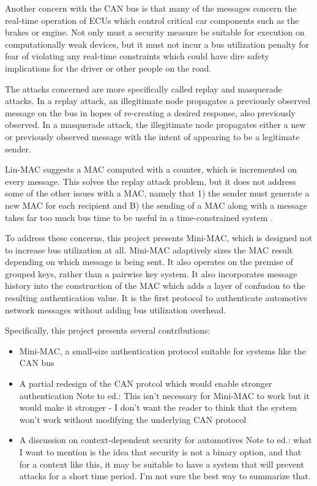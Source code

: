 Another concern with the CAN bus is that many of the messages concern the real-time operation of ECUs which control critical car components such as the brakes or engine. Not only must a security measure be suitable for execution on computationally weak devices, but it must not incur a bus utilization penalty for fear of violating any real-time constraints which could have dire safety implications for the driver or other people on the road.

The attacks concerned are more specifically called replay and masquerade attacks. In a replay attack, an illegitimate node propagates a previously observed message on the bus in hopes of re-creating a desired response, also previously observed. In a masquerade attack, the illegitimate node propagates either a new or previously observed message with the intent of appearing to be a legitimate sender.




Lin-MAC suggests a MAC computed with a counter, which is incremented on every message. This solves the replay attack problem, but it does not address some of the other issues with a MAC, namely that 1) the sender must generate a new MAC for each recipient and B) the sending of a MAC along with a message takes far too much bus time to be useful in a time-constrained system \cite{Lin-MAC}.

To address these concerns, this project presents Mini-MAC, which is designed not to increase bus utilization at all. Mini-MAC adaptively sizes the MAC result depending on which message is being sent. It also operates on the premise of grouped keys, rather than a pairwise key system. It also incorporates message history into the construction of the MAC which adds a layer of confusion to the resulting authentication value. It is the first protocol to authenticate automotive network messages without adding bus utilization overhead.

Specifically, this project presents several contributions:
\begin{itemize}
\item Mini-MAC, a small-size authentication protocol suitable for systems like the CAN bus
\item A partial redesign of the CAN protcol which would enable stronger authentication Note to ed.: This isn't necessary for Mini-MAC to work but it would make it stronger - I don't want the reader to think that the system won't work without modifying the underlying CAN protocol
\item A discussion on context-dependent security for automotives Note to ed.: what I want to mention is the idea that security is not a binary option, and that for a context like this, it may be suitable to have a system that will prevent attacks for a short time period. I'm not sure the best way to summarize that.
\end{itemize}

